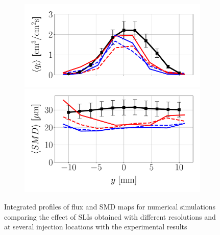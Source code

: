 \begin{figure}[h!]
\begin{subfigure}[b]{0.4\textwidth}
	\flushleft
   \includegraphics[scale=0.35]{./part2_developments/figures_ch6_lagrangian_JICF/params_resol_and_xInj/profiles/flux_along_y}\\
   \vspace{-0.16in}
   \includegraphics[scale=0.35]{./part2_developments/figures_ch6_lagrangian_JICF/params_resol_and_xInj/profiles/SMD_along_y}
\end{subfigure}
\vspace*{-0.1in}
\caption{Integrated profiles of flux and SMD maps for numerical simulations comparing the effect of SLIs obtained with different resolutions and at several injection locations with the experimental results}
\label{fig:profiles_LGS_JICF_resol_and_xInj}
\end{figure}

